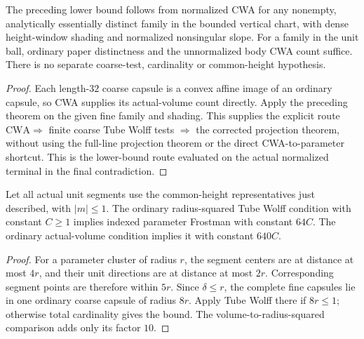 \begin{corollary}
\label{cor:twisted-cwa-dilated}
\leanok
{}
The preceding lower bound follows from normalized CWA for any nonempty,
analytically essentially distinct family in the bounded vertical chart,
with dense height-window shading and normalized nonsingular slope.
For a family in the unit ball, ordinary paper distinctness and the
unnormalized body CWA count suffice. There is no separate coarse-test,
cardinality or common-height hypothesis.
\end{corollary}
\begin{proof}
\leanok
Each length-$32$ coarse capsule is a convex affine image of an ordinary
capsule, so CWA supplies its actual-volume count directly. Apply the
preceding theorem on the given fine family and shading. This supplies
the explicit route $\mathrm{CWA}\Rightarrow$ finite coarse Tube Wolff
tests $\Rightarrow$ the corrected projection theorem, without using
the full-line projection theorem or the direct CWA-to-parameter shortcut.
This is the lower-bound route evaluated on the actual normalized terminal
in the final contradiction.
\end{proof}

\begin{lemma}
\label{lem:common-height-tube-cluster}
\leanok
{}
Let all actual unit segments use the common-height representatives just
described, with $|m|\leq1$. The ordinary radius-squared Tube Wolff
condition with constant $C\geq1$ implies indexed parameter Frostman
with constant $64C$. The ordinary actual-volume condition implies it
with constant $640C$.
\end{lemma}
\begin{proof}
\leanok
For a parameter cluster of radius $r$, the segment centers are at distance
at most $4r$, and their unit directions are at distance at most $2r$.
Corresponding segment points are therefore within $5r$.
Since $\delta\leq r$, the complete fine capsules lie in one ordinary
coarse capsule of radius $8r$. Apply Tube Wolff there if $8r\leq1$;
otherwise total cardinality gives the bound. The volume-to-radius-squared
comparison adds only its factor $10$.
\end{proof}

